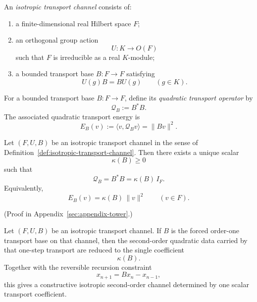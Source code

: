 \begin{definition}
\label{def:isotropic-transport-channel}
An \emph{isotropic transport channel} consists of:
\begin{enumerate}[label=(\roman*), leftmargin=2em, itemsep=0.2em]
\item a finite-dimensional real Hilbert space $F$;
\item an orthogonal group action
      \[
      U:K\to O(F)
      \]
      such that $F$ is irreducible as a real $K$-module;
\item a bounded transport base $B:F\to F$ satisfying
      \[
      U(g)B=BU(g)
      \qquad(g\in K).
      \]
\end{enumerate}
\end{definition}

\begin{definition}
\label{def:quadratic-transport-operator}
For a bounded transport base $B:F\to F$, define its \emph{quadratic transport
operator} by
\[
\mathcal Q_B:=B^*B.
\]
The associated quadratic transport energy is
\[
E_B(v):=\langle v,\mathcal Q_B v\rangle=\|Bv\|^2.
\]
\end{definition}

\begin{theorem}
\label{thm:isotropic-quadratic-transport}
Let $(F,U,B)$ be an isotropic transport channel in the sense of
Definition~\ref{def:isotropic-transport-channel}. Then there exists a unique
scalar
\[
\kappa(B)\ge 0
\]
such that
\[
\mathcal Q_B=B^*B=\kappa(B)\,I_F.
\]
Equivalently,
\[
E_B(v)=\kappa(B)\,\|v\|^2
\qquad(v\in F).
\]
\end{theorem}

(Proof in Appendix~\ref{sec:appendix-tower}.)

\begin{corollary}
\label{cor:isotropic-one-step-quadratic-coefficient}
Let $(F,U,B)$ be an isotropic transport channel. If $B$ is the forced
order-one transport base on that channel, then the second-order quadratic data
carried by that one-step transport are reduced to the single coefficient
\[
\kappa(B).
\]
Together with the reversible recursion constraint
\[
x_{n+1}=Bx_n-x_{n-1},
\]
this gives a constructive isotropic second-order channel determined by one
scalar transport coefficient.
\end{corollary}

